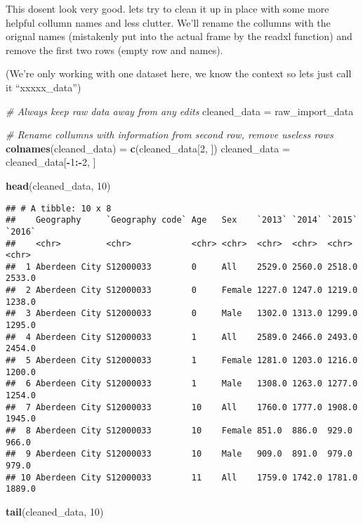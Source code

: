 \documentclass[]{article}
\newenvironment{Shaded}{\begin{snugshade}}{\end{snugshade}}
\newcommand{\KeywordTok}[1]{\textcolor[rgb]{0.13,0.29,0.53}{\textbf{#1}}}
\newcommand{\DecValTok}[1]{\textcolor[rgb]{0.00,0.00,0.81}{#1}}
\newcommand{\StringTok}[1]{\textcolor[rgb]{0.31,0.60,0.02}{#1}}
\newcommand{\CommentTok}[1]{\textcolor[rgb]{0.56,0.35,0.01}{\textit{#1}}}
\newcommand{\OperatorTok}[1]{\textcolor[rgb]{0.81,0.36,0.00}{\textbf{#1}}}
\newcommand{\NormalTok}[1]{#1}
\begin{document}
This dosent look very good. lets try to clean it up in place with some
more helpful collumn names and less clutter. We'll rename the collumns
with the orignal names (mistakenly put into the actual frame by the
readxl function) and remove the first two rows (empty row and names).

(We're only working with one dataset here, we know the context so lets
just call it ``xxxxx\_data'')

\begin{Shaded}
\begin{Highlighting}[]
\CommentTok{# Always keep raw data away from any edits}
\NormalTok{cleaned_data =}\StringTok{  }\NormalTok{raw_import_data}

\CommentTok{# Rename collumns with information from second row, remove useless rows}
\KeywordTok{colnames}\NormalTok{(cleaned_data) =}\StringTok{ }\KeywordTok{c}\NormalTok{(cleaned_data[}\DecValTok{2}\NormalTok{, ])}
\NormalTok{cleaned_data =}\StringTok{ }\NormalTok{cleaned_data[}\OperatorTok{-}\DecValTok{1}\OperatorTok{:-}\DecValTok{2}\NormalTok{, ]}

\KeywordTok{head}\NormalTok{(cleaned_data, }\DecValTok{10}\NormalTok{)}
\end{Highlighting}
\end{Shaded}

\begin{verbatim}
## # A tibble: 10 x 8
##    Geography     `Geography code` Age   Sex    `2013` `2014` `2015` `2016`
##    <chr>         <chr>            <chr> <chr>  <chr>  <chr>  <chr>  <chr> 
##  1 Aberdeen City S12000033        0     All    2529.0 2560.0 2518.0 2533.0
##  2 Aberdeen City S12000033        0     Female 1227.0 1247.0 1219.0 1238.0
##  3 Aberdeen City S12000033        0     Male   1302.0 1313.0 1299.0 1295.0
##  4 Aberdeen City S12000033        1     All    2589.0 2466.0 2493.0 2454.0
##  5 Aberdeen City S12000033        1     Female 1281.0 1203.0 1216.0 1200.0
##  6 Aberdeen City S12000033        1     Male   1308.0 1263.0 1277.0 1254.0
##  7 Aberdeen City S12000033        10    All    1760.0 1777.0 1908.0 1945.0
##  8 Aberdeen City S12000033        10    Female 851.0  886.0  929.0  966.0 
##  9 Aberdeen City S12000033        10    Male   909.0  891.0  979.0  979.0 
## 10 Aberdeen City S12000033        11    All    1759.0 1742.0 1781.0 1889.0
\end{verbatim}

\begin{Shaded}
\begin{Highlighting}[]
\KeywordTok{tail}\NormalTok{(cleaned_data, }\DecValTok{10}\NormalTok{)}
\end{Highlighting}
\end{Shaded}
\end{document}
